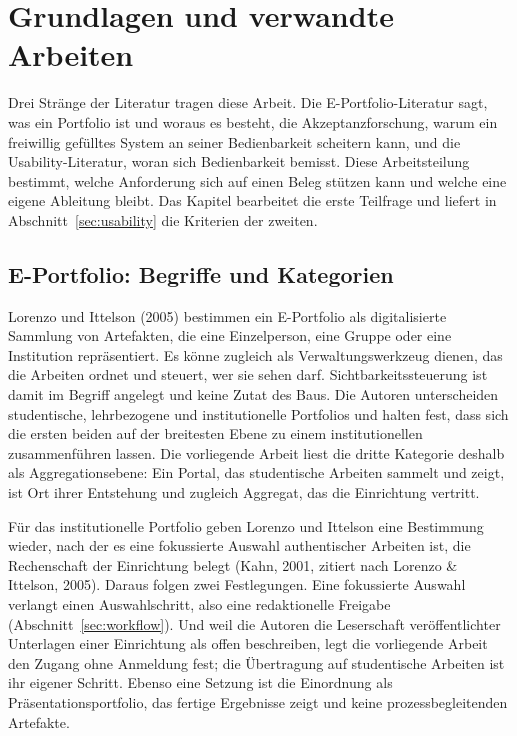 
\chapter{Grundlagen und verwandte Arbeiten}
\label{kap:grundlagen}

Drei Stränge der Literatur tragen diese Arbeit. Die E-Portfolio-Literatur sagt, was ein Portfolio ist und woraus es besteht, die Akzeptanzforschung, warum ein freiwillig gefülltes System an seiner Bedienbarkeit scheitern kann, und die Usability-Literatur, woran sich Bedienbarkeit bemisst. Diese Arbeitsteilung bestimmt, welche Anforderung sich auf einen Beleg stützen kann und welche eine eigene Ableitung bleibt. Das Kapitel bearbeitet die erste Teilfrage und liefert in Abschnitt~\ref{sec:usability} die Kriterien der zweiten.

\section{E-Portfolio: Begriffe und Kategorien}
\label{sec:eportfolio}

Lorenzo und Ittelson (2005) bestimmen ein E-Portfolio als digitalisierte Sammlung von Artefakten, die eine Einzelperson, eine Gruppe oder eine Institution repräsentiert. Es könne zugleich als Verwaltungswerkzeug dienen, das die Arbeiten ordnet und steuert, wer sie sehen darf. Sichtbarkeitssteuerung ist damit im Begriff angelegt und keine Zutat des Baus. Die Autoren unterscheiden studentische, lehrbezogene und institutionelle Portfolios und halten fest, dass sich die ersten beiden auf der breitesten Ebene zu einem institutionellen zusammenführen lassen. Die vorliegende Arbeit liest die dritte Kategorie deshalb als Aggregationsebene: Ein Portal, das studentische Arbeiten sammelt und zeigt, ist Ort ihrer Entstehung und zugleich Aggregat, das die Einrichtung vertritt.

Für das institutionelle Portfolio geben Lorenzo und Ittelson eine Bestimmung wieder, nach der es eine fokussierte Auswahl authentischer Arbeiten ist, die Rechenschaft der Einrichtung belegt (Kahn, 2001, zitiert nach Lorenzo \& Ittelson, 2005). Daraus folgen zwei Festlegungen. Eine fokussierte Auswahl verlangt einen Auswahlschritt, also eine redaktionelle Freigabe (Abschnitt~\ref{sec:workflow}). Und weil die Autoren die Leserschaft veröffentlichter Unterlagen einer Einrichtung als offen beschreiben, legt die vorliegende Arbeit den Zugang ohne Anmeldung fest; die Übertragung auf studentische Arbeiten ist ihr eigener Schritt. Ebenso eine Setzung ist die Einordnung als Präsentationsportfolio, das fertige Ergebnisse zeigt und keine prozessbegleitenden Artefakte.

